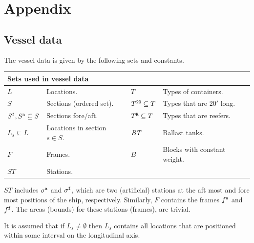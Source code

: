 {}


\section*{Appendix}
\subsection*{Vessel data}
The vessel data is given by the following sets and constants.

\vspace{1mm}
\noindent
\begin{tabular}{p{1.8cm}p{4cm}|p{1.3cm}p{4.5cm}}
\multicolumn{2}{l}{\textbf{Sets used in vessel data}}\\
\hline\noalign{\smallskip}
$L$  & Locations. &
$T$	 & Types of containers.\\ 
$S$	 & Sections (ordered set).&
$T^{\texttt{20}}\subseteq T$ & Types that are $20'$ long. \\
$S^{\texttt{f}}, S^{\texttt{a}}\subseteq S$ & Sections fore/aft. &
$T^{\texttt{R}}\subseteq T$ & Types that are reefers.\\
$L_s\subseteq L$ & Locations in section $s\in S$. &
$\mathit{BT}$ & Ballast tanks. \\
$F$	 & Frames. &
$B$ & Blocks with constant weight.\\
$ST$ & Stations. 
\end{tabular}

\vspace{1mm}
\noindent
$ST$ includes $\sigma^{\texttt{a}}$ and $\sigma^{\texttt{f}}$, which are two (artificial) stations at the aft most and fore most positions of the ship, respectively. Similarly, $F$ contains the frames $f^{\texttt{a}}$ and $f^{\texttt{f}}$. The areas (bounds) for these stations (frames), are trivial.

It is assumed that if $L_s\neq \emptyset$ then $L_s$ contains all locations that are positioned within some interval on the longitudinal axis.    


